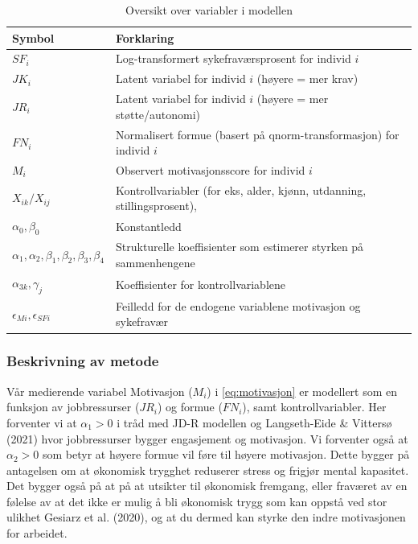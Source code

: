 \documentclass[
  12pt,
  a4paper,
  DIV=11,
  numbers=noendperiod]{scrartcl}
\begin{document}
\begin{table}[H]
\centering
\begin{tabular}{ll}
\toprule
Symbol & Forklaring \\ 
\midrule
$SF_i$ & Log-transformert sykefraværsprosent for individ $i$ \\
$JK_i$ & Latent variabel for individ $i$ (høyere = mer krav) \\
$JR_i$ & Latent variabel for individ $i$ (høyere = mer støtte/autonomi) \\
$FN_i$ & Normalisert formue (basert på qnorm-transformasjon) for individ $i$ \\
$M_i$ & Observert motivasjonsscore for individ $i$ \\
$X_{ik}/X_{ij}$ & Kontrollvariabler (for eks, alder, kjønn, utdanning, stillingsprosent),  \\
$\alpha_0, \beta_0$ & Konstantledd \\
$\alpha_1, \alpha_2, \beta_1, \beta_2, \beta_3, \beta_4$ & Strukturelle koeffisienter som estimerer styrken på sammenhengene \\
$\alpha_{3k}, \gamma_{j}$ & Koeffisienter for kontrollvariablene \\
$\epsilon_{Mi}, \epsilon_{SFi}$ & Feilledd for de endogene variablene motivasjon og sykefravær \\
\hline
\end{tabular}
\caption{Oversikt over variabler i modellen}
\label{tab:variabler}
\end{table}

\subsubsection{Beskrivning av metode}\label{beskrivning-av-metode}

Vår medierende variabel Motivasjon (\(M_i\)) i \autoref{eq:motivasjon}
er modellert som en funksjon av jobbressurser (\(JR_i\)) og formue
(\(FN_i\)), samt kontrollvariabler. Her forventer vi at \(\alpha_1 > 0\)
i tråd med JD-R modellen og Langseth-Eide \& Vittersø (2021) hvor
jobbressurser bygger engasjement og motivasjon. Vi forventer også at
\(\alpha_2 > 0\) som betyr at høyere formue vil føre til høyere
motivasjon. Dette bygger på antagelsen om at økonomisk trygghet
reduserer stress og frigjør mental kapasitet. Det bygger også på at på
at utsikter til økonomisk fremgang, eller fraværet av en følelse av at
det ikke er mulig å bli økonomisk trygg som kan oppstå ved stor ulikhet
Gesiarz et al. (2020), og at du dermed kan styrke den indre motivasjonen
for arbeidet.
\end{document}
